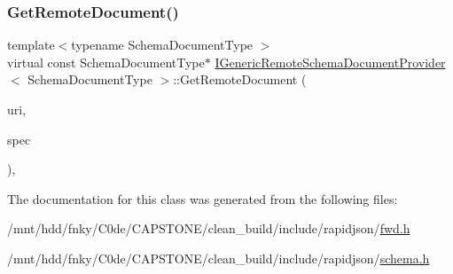 \mbox{\label{classIGenericRemoteSchemaDocumentProvider_a71b8b9eda5b5009df44fffdce0a3eb6f}} 
\subsubsection{\texorpdfstring{Get\+Remote\+Document()}{GetRemoteDocument()}\hspace{0.1cm}{\footnotesize\ttfamily [2/2]}}
{\footnotesize\ttfamily template$<$typename Schema\+Document\+Type $>$ \\
virtual const Schema\+Document\+Type$\ast$ \hyperlink{classIGenericRemoteSchemaDocumentProvider}{I\+Generic\+Remote\+Schema\+Document\+Provider}$<$ Schema\+Document\+Type $>$\+::Get\+Remote\+Document (\begin{DoxyParamCaption}\item[{const \hyperlink{classGenericUri}{Generic\+Uri}$<$ \hyperlink{classIGenericRemoteSchemaDocumentProvider_aefaefd0d3fc938b6a81634edf1646205}{Value\+Type}, \hyperlink{classIGenericRemoteSchemaDocumentProvider_a79476f0e0f4d51ca7244685698dadbd0}{Allocator\+Type} $>$}]{uri,  }\item[{\hyperlink{structSpecification}{Specification} \&}]{spec }\end{DoxyParamCaption})\hspace{0.3cm}{\ttfamily [inline]}, {\ttfamily [virtual]}}



The documentation for this class was generated from the following files\+:\begin{DoxyCompactItemize}
\item 
/mnt/hdd/fnky/\+C0de/\+C\+A\+P\+S\+T\+O\+N\+E/clean\+\_\+build/include/rapidjson/\hyperlink{fwd_8h}{fwd.\+h}\item 
/mnt/hdd/fnky/\+C0de/\+C\+A\+P\+S\+T\+O\+N\+E/clean\+\_\+build/include/rapidjson/\hyperlink{schema_8h}{schema.\+h}\end{DoxyCompactItemize}
